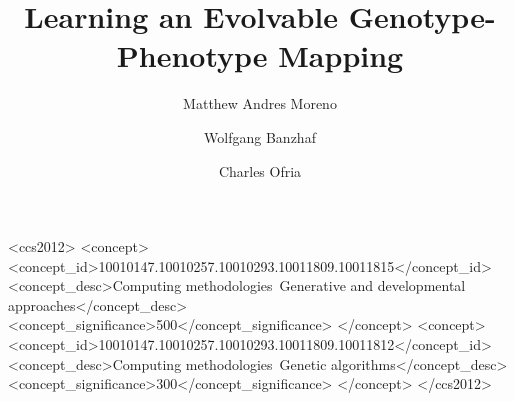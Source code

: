 \documentclass[sigconf]{acmart}
\begin{document}
\title{Learning an Evolvable Genotype-Phenotype Mapping}

\author{Matthew Andres Moreno}

\author{Wolfgang Banzhaf}

\author{Charles Ofria}

\begin{abstract}

\end{abstract}

%
%
\begin{CCSXML}
<ccs2012>
<concept>
<concept_id>10010147.10010257.10010293.10011809.10011815</concept_id>
<concept_desc>Computing methodologies~Generative and developmental approaches</concept_desc>
<concept_significance>500</concept_significance>
</concept>
<concept>
<concept_id>10010147.10010257.10010293.10011809.10011812</concept_id>
<concept_desc>Computing methodologies~Genetic algorithms</concept_desc>
<concept_significance>300</concept_significance>
</concept>
</ccs2012>
\end{CCSXML}



\maketitle





\end{document}
